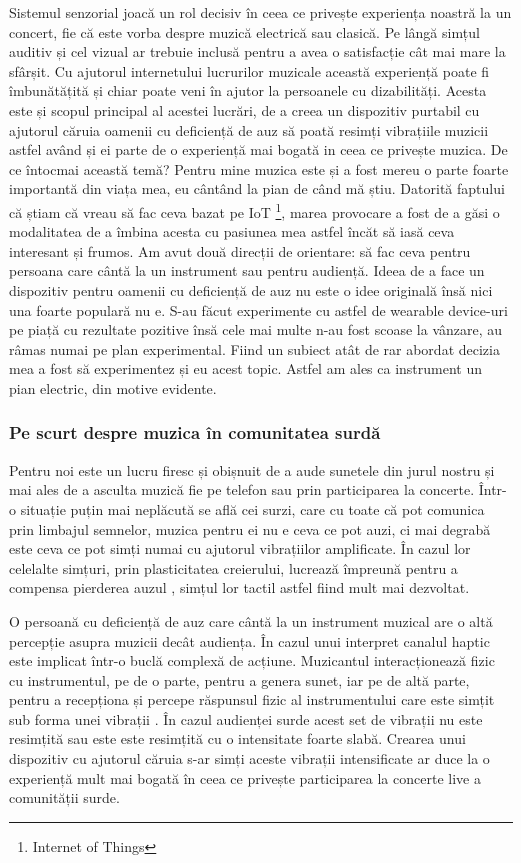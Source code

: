 \documentclass[../IoMusT.tex]{subfiles}
\begin{document}
\par Sistemul senzorial joacă un rol decisiv în ceea ce privește experiența noastră la un concert, fie că este vorba despre muzică electrică sau clasică. Pe lângă simțul auditiv și cel vizual ar trebuie inclusă pentru a avea o sa\-tis\-fac\-ți\-e cât mai mare la sfârșit. Cu ajutorul internetului lucrurilor muzicale această experiență poate fi îmbunătățită și chiar poate veni în ajutor la persoanele cu dizabilități. Acesta este și scopul principal al acestei lucrări, de a creea un dispozitiv purtabil cu ajutorul căruia oamenii cu deficiență de auz să poată resimți vibrațiile muzicii astfel având și ei parte de o experiență mai bogată in ceea ce privește muzica. De ce întocmai această temă? Pentru mine mu\-zi\-ca este și a fost mereu o parte foarte importantă din viața mea, eu cântând la pian de când mă știu. Datorită faptului că știam că vreau să fac ceva bazat pe IoT \footnote{Internet of Things}, marea provocare a fost de a găsi o modalitatea de a îmbina acesta cu pasiunea mea astfel încăt să iasă ceva interesant și frumos. Am avut două direcții de orientare: să fac ceva pentru persoana care cântă la un instrument sau pentru audiență. Ideea de a face un dispozitiv pentru oamenii cu deficiență de auz nu este o idee originală însă nici una foarte populară nu e. S-au făcut experimente cu astfel de wearable device-uri pe piață cu rezultate pozitive însă cele mai multe n-au fost scoase la vânzare, au râmas numai pe plan experimental. Fiind un subiect atât de rar abordat decizia mea a fost să experimentez și eu acest topic. Astfel am ales ca instrument un pian electric, din motive evidente.

\subsubsection{Pe scurt despre muzica în comunitatea surdă}
Pentru noi este un lucru firesc și obișnuit de a aude sunetele din jurul nostru și mai ales de a asculta muzică fie pe telefon sau prin participarea la concerte. Într-o situație puțin mai neplăcută se află cei surzi, care cu toate că pot comunica prin limbajul semnelor, muzica pentru ei nu e ceva ce pot auzi, ci mai degrabă este ceva ce pot simți numai cu ajutorul vibrațiilor amplificate. În cazul lor celelalte simțuri, prin plasticitatea creierului, lucrează împreună pentru a compensa pierderea auzul \cite{DEAF}, simțul lor tactil astfel fiind mult mai dezvoltat. 
\\
\par O persoană cu deficiență de auz care cântă la un instrument muzical are o altă percepție asupra muzicii decât audiența. În cazul unui interpret canalul haptic este implicat într-o buclă complexă de acțiune. Muzicantul interacționează fizic cu instrumentul, pe de o parte, pentru a genera sunet, iar pe de altă parte, pentru a recepționa și percepe răspunsul fizic al instrumentului care este simțit sub forma unei vibrații \cite{Haptic}. În cazul audienței surde acest set de vibrații nu este resimțită sau este este resimțită cu o intensitate foarte slabă. Crearea unui dispozitiv cu ajutorul căruia s-ar simți aceste vibrații intensificate ar duce la o experiență mult mai bogată în ceea ce privește participarea la concerte live a comunității surde.
\end{document}
